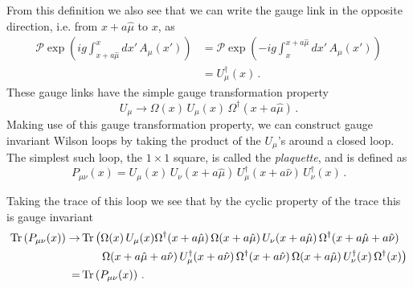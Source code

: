 From this definition we also see that we can write the gauge link in the opposite direction, i.e. from $x+a\hat{\mu}$ to $x$, as
\begin{align*}
\mathcal{P}\exp\left(ig\int^x_{x+a\hat{\mu}}dx'\,A_\mu(x')\right) &= \mathcal{P}\exp\left(-ig\int_x^{x+a\hat{\mu}}dx'\,A_\mu(x')\right)\\
&=U^\dag_\mu(x)\, .
\end{align*}
These gauge links have the simple gauge transformation property~\cite{Lepage:1998dt}
\begin{equation}
U_\mu\rightarrow \Omega(x)\,U_\mu(x)\,\Omega^\dag(x+a\hat{\mu})\, .
\end{equation}
Making use of this gauge transformation property, we can construct gauge invariant Wilson loops by taking the product of the $U_\mu$'s around a closed loop. The simplest such loop, the $1\times 1$ square, is called the \textit{plaquette}, and is defined as
\begin{equation}
P_{\mu\nu}(x) = U_\mu(x)\,U_\nu(x+a\hat{\mu})\, U_\mu^\dag(x+a\hat{\nu})\, U_\nu^\dag(x)\, .
\label{eq:Plaquette}
\end{equation}

Taking the trace of this loop we see that by the cyclic property of the trace this is gauge invariant
\begin{align*}
\operatorname{Tr}\left(P_{\mu\nu}(x)\right)\rightarrow& \operatorname{Tr} \left(\Omega(x)\,U_\mu(x)\Omega^\dag(x+a\hat{\mu})\,\Omega(x+a\hat{\mu})\,U_\nu(x+a\hat{\mu})\,\Omega^\dag(x+a\hat{\mu}+a\hat{\nu})\right.\\
&~~~~~\left.\Omega(x+a\hat{\mu}+a\hat{\nu})\,U_\mu^\dag(x+a\hat{\nu})\,\Omega^\dag(x+a\hat{\nu})\,\Omega(x+a\hat{\mu})\, U_\nu^\dag(x)\,\Omega^\dag(x)\right)\\
=&\operatorname{Tr}\left(P_{\mu\nu}(x)\right)\, .
\end{align*}

